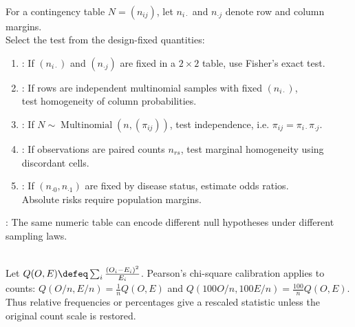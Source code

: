 \begin{principle} \label{prin:categorical-data-design-before-test} \\
For a contingency table $N=(n_{ij})$, let $n_{i\cdot}$ and $n_{\cdot j}$ denote row and column margins.\\
Select the test from the design-fixed quantities:
\begin{enumerate}[label=(\roman*)]
\setlength{\itemsep}{0pt}
\item {}: If $(n_{i\cdot})$ and $(n_{\cdot j})$ are fixed in a $2\times2$ table, use Fisher's exact test.
\item {}: If rows are independent multinomial samples with fixed $(n_{i\cdot})$,\\
test homogeneity of column probabilities.
\item {}: If $N\sim\operatorname{Multinomial}(n,(\pi_{ij}))$, test independence, i.e. $\pi_{ij}=\pi_{i\cdot}\pi_{\cdot j}$.
\item {}: If observations are paired counts $n_{rs}$, test marginal homogeneity using discordant cells.
\item {}: If $(n_{\cdot0},n_{\cdot1})$ are fixed by disease status, estimate odds ratios.\\
Absolute risks require population margins.
\end{enumerate}
: The same numeric table can encode different null hypotheses under different sampling laws.
\end{principle}

\begin{remark} \label{rem:counts-not-percentages-in-chi-square-tests} \\
Let $Q(O,E)\defeq\sum_i\frac{(O_i-E_i)^2}{E_i}$. Pearson's chi-square calibration applies to counts: $Q(O/n,E/n)=\frac{1}{n}Q(O,E)$ and $Q(100O/n,100E/n)=\frac{100}{n}Q(O,E)$. Thus relative frequencies or percentages give a rescaled statistic unless the original count scale is restored.
\end{remark}
